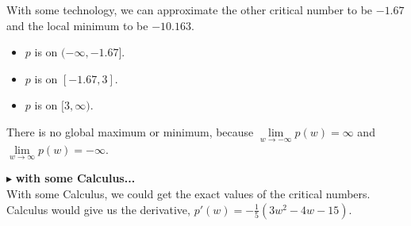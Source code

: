 \documentclass{ximera}
\begin{document}
\begin{example}
\begin{explanation}
\begin{image}
\end{image}

With some technology, we can approximate the other critical number to be $-1.67$ and the local minimum to be $-10.163$.


\begin{itemize}
\item $p$ is   on $(-\infty, -1.67]$.
\item $p$ is   on $[-1.67, 3]$.
\item $p$ is   on $[3, \infty)$.
\end{itemize}



There is no global maximum or minimum, because  $\lim\limits_{w \to -\infty}p(w) = \infty$ and $\lim\limits_{w \to \infty}p(w) = -\infty$. 


\end{explanation}

\end{example}


$\blacktriangleright$  \textbf{\textcolor{blue!55!black}{with some Calculus...}} \\


With some Calculus, we could get the exact values of the critical numbers. \\



Calculus would give us the derivative, $p'(w) = -\frac{1}{5}(3w^2 - 4w - 15)$. \\
\end{document}
